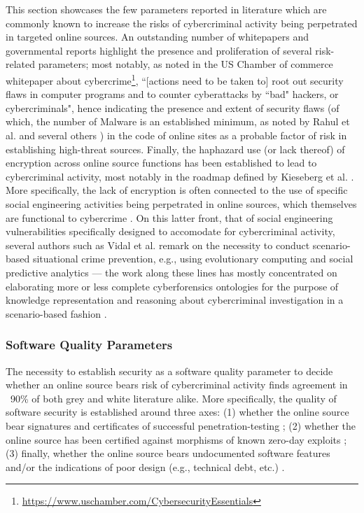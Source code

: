 This section showcases the few parameters reported in literature which are commonly known to increase the risks of cybercriminal activity being perpetrated in targeted online sources. An outstanding number of whitepapers and governmental reports highlight the presence and proliferation of several risk-related parameters; most notably, as noted in the US Chamber of commerce whitepaper about cybercrime\footnote{\url{https://www.uschamber.com/CybersecurityEssentials}}, ``[actions need to be taken to] root out security flaws in computer programs and to counter cyberattacks by ``bad" hackers, or cybercriminals", hence indicating the presence and extent of security flaws (of which, the number of Malware is an established minimum, as noted by Rahul et al. \cite{Rahul} and several others \cite{Caballero12}) in the code of online sites as a probable factor of risk in establishing high-threat sources. Finally, the haphazard use (or lack thereof) of encryption across online source functions has been established to lead to cybercriminal activity, most notably in the roadmap defined by Kieseberg et al. \cite{KiesebergSR15}. More specifically, the lack of encryption is often connected to the use of specific social engineering activities being perpetrated in online sources, which themselves are functional to cybercrime \cite{Gharibi}. On this latter front, that of social engineering vulnerabilities specifically designed to accomodate for cybercriminal activity, several authors such as Vidal et al. \cite{VidalC17} remark on the necessity to conduct scenario-based situational crime prevention, e.g., using evolutionary computing and social predictive analytics --- the work along these lines has mostly concentrated on elaborating more or less complete cyberforensics ontologies for the purpose of knowledge representation and reasoning about cybercriminal investigation in a scenario-based fashion \cite{ParkCK09}.

\subsubsection{Software Quality Parameters}

The necessity to establish security as a software quality parameter to decide whether an online source bears risk of cybercriminal activity finds agreement in ~90\% of both grey and white literature alike. More specifically, the quality of software security is established around three axes: (1) whether the online source bear signatures and certificates of successful penetration-testing \cite{franklin}; (2) whether the online source has been certified against morphisms \cite{li06ieee,GuptaR18} of known zero-day exploits \cite{Danforth11,BilgeD13}; (3) finally, whether the online source bears undocumented software features and/or the indications of poor design (e.g., technical debt, etc.) \cite{NordOSSK16}.

